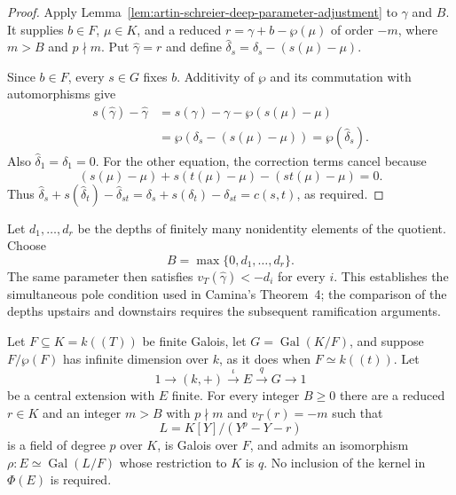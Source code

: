 \begin{proof}
Apply Lemma~\ref{lem:artin-schreier-deep-parameter-adjustment}
to $\gamma$ and $B$. It supplies $b\in F$, $\mu\in K$, and a
reduced $r=\gamma+b-\wp(\mu)$ of order $-m$, where $m>B$
and $p\nmid m$. Put $\widehat\gamma=r$ and define
$\widehat\delta_s=\delta_s-(s(\mu)-\mu)$.

Since $b\in F$, every $s\in G$ fixes $b$.
Additivity of $\wp$ and its commutation with automorphisms give
\[
\begin{aligned}
 s(\widehat\gamma)-\widehat\gamma
 &=s(\gamma)-\gamma-\wp(s(\mu)-\mu)\\
 &=\wp(\delta_s-(s(\mu)-\mu))
  =\wp(\widehat\delta_s).
\end{aligned}
\]
Also $\widehat\delta_1=\delta_1=0$.
For the other equation, the correction terms cancel because
\[
 (s(\mu)-\mu)+s(t(\mu)-\mu)-(st(\mu)-\mu)=0.
\]
Thus
$\widehat\delta_s+s(\widehat\delta_t)-\widehat\delta_{st}
 =\delta_s+s(\delta_t)-\delta_{st}=c(s,t)$,
as required.
\end{proof}

Let $d_1,\ldots,d_r$ be the depths of finitely many nonidentity
elements of the quotient. Choose
\[
 B=\max\{0,d_1,\ldots,d_r\}.
\]
The same parameter then satisfies
$v_T(\widehat\gamma)<-d_i$ for every $i$.
This establishes the simultaneous pole condition used in
Camina's Theorem~4; the comparison of the depths upstairs and
downstairs requires the subsequent ramification arguments.


\begin{theorem}
\label{thm:witt-reduced-central-lift}
\leanok
Let $F\subseteq K=k((T))$ be finite Galois, let
$G=\operatorname{Gal}(K/F)$, and suppose $F/\wp(F)$ has
infinite dimension over $k$, as it does when $F\simeq k((t))$.
Let
\[
 1\longrightarrow(k,+)\xrightarrow{\iota}E
 \xrightarrow{q}G\longrightarrow1
\]
be a central extension with $E$ finite. For every integer $B\ge0$
there are a reduced $r\in K$ and an integer $m>B$ with $p\nmid m$
and $v_T(r)=-m$ such that
\[
 L=K[Y]/(Y^p-Y-r)
\]
is a field of degree $p$ over $K$, is Galois over $F$, and admits
an isomorphism $\rho:E\simeq\operatorname{Gal}(L/F)$ whose
restriction to $K$ is $q$.
No inclusion of the kernel in $\Phi(E)$ is required.
\end{theorem}

